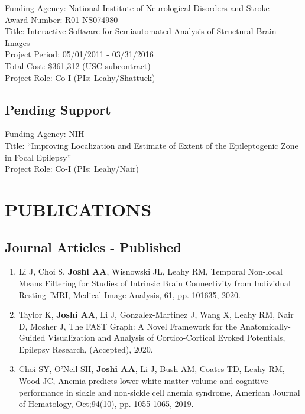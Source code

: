 \documentclass[overlapped,line,letterpaper]{res}
\begin{document}
\begin{resume}
Funding Agency: National Institute of Neurological Disorders and Stroke\\
Award Number: R01 NS074980 \\
Title: Interactive Software for Semiautomated Analysis of Structural Brain  Images \\
Project Period: 05/01/2011 - 03/31/2016 \\
Total Cost: \$361,312 (USC subcontract) \\
Project Role: Co-I (PIs: Leahy/Shattuck) \\

\subsection{Pending Support}

Funding Agency: NIH\\
Title: “Improving Localization and Estimate of Extent of the Epileptogenic Zone in Focal Epilepsy” \\
Project Role: Co-I (PIs: Leahy/Nair)\\

\section{PUBLICATIONS}

\subsection{Journal Articles -  Published}
\begin{enumerate}
    \item Li J, Choi S, \textbf{Joshi AA}, Wisnowski JL, Leahy RM, {Temporal Non-local Means Filtering for Studies of Intrinsic Brain Connectivity from Individual Resting fMRI}, Medical Image Analysis, 61, pp. 101635, 2020.
    
    \item Taylor K, \textbf{Joshi AA}, Li J, Gonzalez-Martinez J, Wang X, Leahy RM, Nair D, Mosher J, {The FAST Graph: A Novel Framework for the Anatomically-Guided Visualization and Analysis of Cortico-Cortical Evoked Potentials}, Epilepsy Research, (Accepted), 2020.

    \item  Choi SY, O'Neil SH, \textbf{Joshi AA}, Li J, Bush AM, Coates TD, Leahy RM, Wood JC, {Anemia predicts lower white matter volume and cognitive performance in sickle and non‐sickle cell anemia syndrome}, American Journal of Hematology, Oct;94(10), pp. 1055-1065, 2019.


\end{enumerate}
\end{resume}
\end{document}
